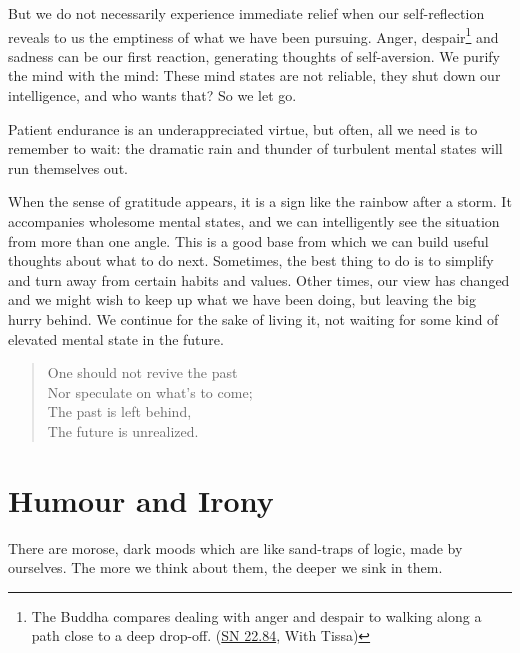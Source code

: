 But we do not necessarily experience immediate relief when our
self-reflection reveals to us the emptiness of what we have been
pursuing. Anger, despair\footnote{The Buddha compares dealing with anger
  and despair to walking along a path close to a deep drop-off.
  (\href{https://suttacentral.net/sn22.84}{SN 22.84}, With Tissa)} and
sadness can be our first reaction, generating thoughts of self-aversion.
We purify the mind with the mind: These mind states are not reliable,
they shut down our intelligence, and who wants that? So we let go.


Patient endurance is an underappreciated virtue, but often, all we need
is to remember to wait: the dramatic rain and thunder of turbulent
mental states will run themselves out.

When the sense of gratitude appears, it is a sign like the rainbow after
a storm. It accompanies wholesome mental states, and we can
intelligently see the situation from more than one angle. This is a good
base from which we can build useful thoughts about what to do next.
Sometimes, the best thing to do is to simplify and turn away from
certain habits and values. Other times, our view has changed and we
might wish to keep up what we have been doing, but leaving the big hurry
behind. We continue for the sake of living it, not waiting for some kind
of elevated mental state in the future.

\begin{quote}
One should not revive the past\\
Nor speculate on what's to come;\\
The past is left behind,\\
The future is unrealized.

\bigskip

\end{quote}

\section{Humour and Irony}


\noindent There are morose, dark moods which are like sand-traps of
logic, made by ourselves. The more we think about them, the deeper we
sink in them.


